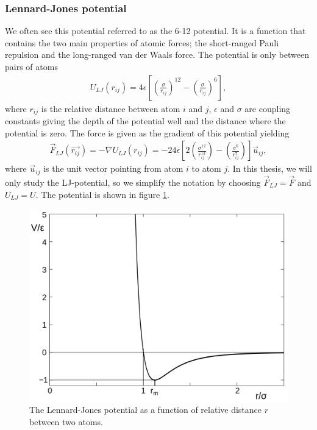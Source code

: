 \subsubsection{Lennard-Jones potential}
\label{sec:md_lj_potential}
We often see this potential referred to as the 6-12 potential. It is a function that contains the two main properties of atomic forces; the short-ranged Pauli repulsion and the long-ranged van der Waals force. The potential is only between pairs of atoms
\begin{align}
	\label{eq:md_potential_energy}
	U_{LJ}(r_{ij}) = 4\epsilon\left[\left(\frac{\sigma}{r_{ij}}\right)^{12} - \left(\frac{\sigma}{r_{ij}}\right)^{6}\right],
\end{align}
where $r_{ij}$ is the relative distance between atom $i$ and $j$, $\epsilon$ and $\sigma$ are coupling constants giving the depth of the potential well and the distance where the potential is zero. The force is given as the gradient of this potential yielding 
\begin{align}
	\label{eq:md_lj_force}
	\vec F_{LJ}(\vec{r_{ij}}) = -\nabla U_{LJ}(r_{ij}) = -24\epsilon\left[2\left(\frac{\sigma^{12}}{r_{ij}^{13}}\right) - \left(\frac{\sigma^6}{r_{ij}^7}\right)\right]\vec u_{ij},
\end{align}
where $\vec u_{ij}$ is the unit vector pointing from atom $i$ to atom $j$. In this thesis, we will only study the LJ-potential, so we simplify the notation by choosing $\vec F_{LJ} = \vec F$ and $U_{LJ} = U$. The potential is shown in figure \ref{fig:md_lennard_jones}.
\begin{figure}[h]
\begin{center}
\includegraphics[width=1.0\textwidth, trim=0cm 0cm 0cm 0cm, clip]{MD/figures/lennard_jones.png}
\end{center}
\caption{The Lennard-Jones potential as a function of relative distance $r$ between two atoms.}
\label{fig:md_lennard_jones}
\end{figure}
